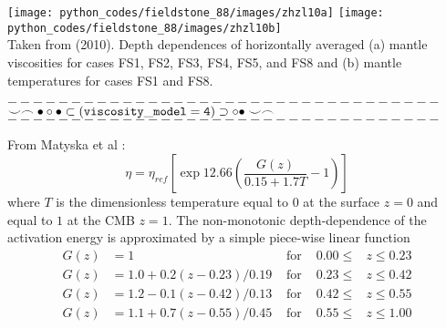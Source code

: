 \begin{center}
\texttt{[image: python\_codes/fieldstone\_88/images/zhzl10a]}
\texttt{[image: python\_codes/fieldstone\_88/images/zhzl10b]}\\
{\captionfont Taken from \textcite{zhzl10} (2010).
Depth dependences of horizontally averaged
(a) mantle viscosities for cases FS1, FS2, FS3, FS4, FS5,
and FS8 and (b) mantle temperatures for cases FS1 and FS8.}
\end{center}

\begin{center}
$----------------------------------$\\
$\smile \frown \bullet \circ \bullet \subset ( {\tt viscosity\_model=4} ) \supset \circ \bullet \smile \frown$\\
$----------------------------------$
\end{center}

From Matyska et al \cite{mayw11}: 
\[
\eta = \eta_{ref}\left[  \exp 12.66\left(   \frac{G(z)}{0.15+1.7T}-1  \right) \right]
\]
where $T$ is the dimensionless temperature equal to $0$ at the surface
$z=0$ and equal to $1$ at the CMB $z=1$.
The non-monotonic depth-dependence of the activation energy
is approximated by a simple piece-wise linear function
\begin{align}
G(z)&=1                    & \text{ for }  &0.00\leq &z \leq 0.23 \\
G(z)&=1.0+0.2(z-0.23)/0.19 & \text{ for }  &0.23\leq &z \leq 0.42 \\
G(z)&=1.2-0.1(z-0.42)/0.13 & \text{ for }  &0.42\leq &z \leq 0.55 \\
G(z)&=1.1+0.7(z-0.55)/0.45 & \text{ for }  &0.55\leq &z \leq 1.00 
\end{align}


